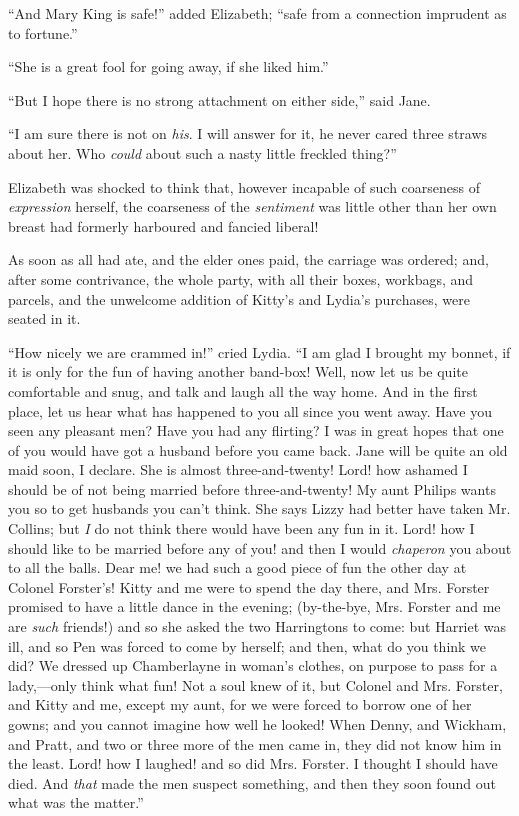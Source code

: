 \documentclass[12pt]{book}
\begin{document}
``And Mary King is safe!'' added Elizabeth; ``safe from a connection imprudent as to fortune.''

``She is a great fool for going away, if she liked him.''

``But I hope there is no strong attachment on either side,'' said Jane.

``I am sure there is not on \textit{his}. I will answer for it, he never cared three straws about her. Who \textit{could} about such a nasty little freckled thing?''

Elizabeth was shocked to think that, however incapable of such coarseness of \textit{expression} herself, the coarseness of the \textit{sentiment} was little other than her own breast had formerly harboured and fancied liberal!

As soon as all had ate, and the elder ones paid, the carriage was ordered; and, after some contrivance, the whole party, with all their boxes, workbags, and parcels, and the unwelcome addition of Kitty's and Lydia's purchases, were seated in it.

``How nicely we are crammed in!'' cried Lydia. ``I am glad I brought my bonnet, if it is only for the fun of having another band-box! Well, now let us be quite comfortable and snug, and talk and laugh all the way home. And in the first place, let us hear what has happened to you all since you went away. Have you seen any pleasant men? Have you had any flirting? I was in great hopes that one of you would have got a husband before you came back. Jane will be quite an old maid soon, I declare. She is almost three-and-twenty! Lord! how ashamed I should be of not being married before three-and-twenty! My aunt Philips wants you so to get husbands you can't think. She says Lizzy had better have taken Mr. Collins; but \textit{I} do not think there would have been any fun in it. Lord! how I should like to be married before any of you! and then I would \textit{chaperon} you about to all the balls. Dear me! we had such a good piece of fun the other day at Colonel Forster's! Kitty and me were to spend the day there, and Mrs. Forster promised to have a little dance in the evening; (by-the-bye, Mrs. Forster and me are \textit{such} friends!) and so she asked the two Harringtons to come: but Harriet was ill, and so Pen was forced to come by herself; and then, what do you think we did? We dressed up Chamberlayne in woman's clothes, on purpose to pass for a lady,---only think what fun! Not a soul knew of it, but Colonel and Mrs. Forster, and Kitty and me, except my aunt, for we were forced to borrow one of her gowns; and you cannot imagine how well he looked! When Denny, and Wickham, and Pratt, and two or three more of the men came in, they did not know him in the least. Lord! how I laughed! and so did Mrs. Forster. I thought I should have died. And \textit{that} made the men suspect something, and then they soon found out what was the matter.''
\end{document}
